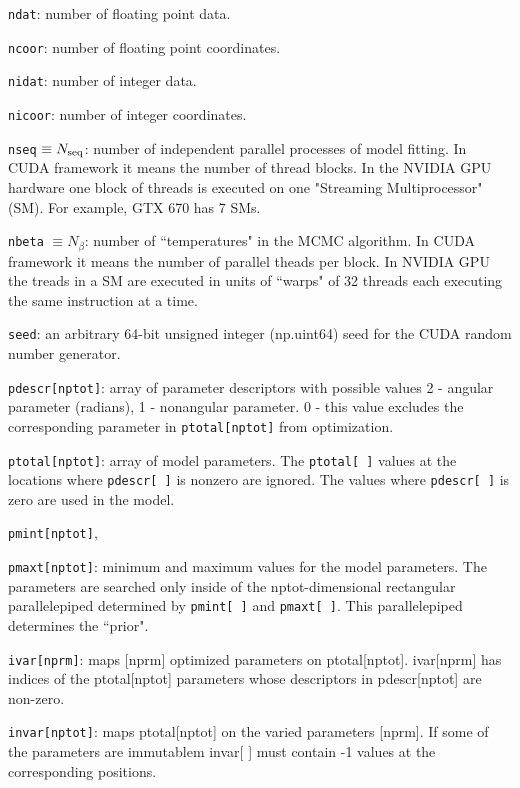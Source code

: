 \documentclass[preprint2]{aastex}
\begin{document}
\verb|ndat|: number of floating point data.

\verb|ncoor|: number of floating point coordinates.

\verb|nidat|: number of integer data.

\verb|nicoor|: number of integer coordinates.

\verb|nseq| $\equiv N_{\rm seq}$: number of independent parallel processes of model fitting. In CUDA
      framework it means the number of thread blocks. In the NVIDIA
      GPU hardware one block of threads is executed on one
      "Streaming Multiprocessor" (SM). For example, GTX 670 has 7 SMs. 

\verb|nbeta| $\equiv N_\beta$: number of ``temperatures" in the MCMC algorithm. In CUDA framework
       it means the number of parallel theads per block. In NVIDIA GPU
       the treads in a SM are executed in units of ``warps" of 32 threads
       each executing the same instruction at a time.
       
\verb|seed|: an arbitrary 64-bit unsigned integer (np.uint64) seed for the CUDA
      random number generator. 

\verb|pdescr[nptot]|: array of parameter descriptors with possible values
               2 - angular parameter (radians), 1 - nonangular parameter.
               0 - this value excludes the corresponding parameter in
                   \verb|ptotal[nptot]| from optimization.
                   
\verb|ptotal[nptot]|: array of model parameters. The \verb|ptotal[ ]| values at
               the locations where \verb|pdescr[ ]| is nonzero are ignored.
               The values where \verb|pdescr[ ]| is zero are used in the model.
               
\verb|pmint[nptot]|,

\verb|pmaxt[nptot]|: minimum and maximum values for the model parameters.
              The parameters are searched only inside of the
              nptot-dimensional rectangular parallelepiped determined by
              \verb|pmint[ ]| and \verb|pmaxt[ ]|. This parallelepiped determines the
             ``prior".

\verb|ivar[nprm]|: maps [nprm] optimized parameters on ptotal[nptot].
            ivar[nprm] has indices of the ptotal[nptot] parameters whose
            descriptors in pdescr[nptot] are non-zero.

\verb|invar[nptot]|: maps ptotal[nptot] on the varied parameters [nprm]. If some
              of the parameters are immutablem invar[ ] must contain -1 values
              at the corresponding positions.
\end{document}
